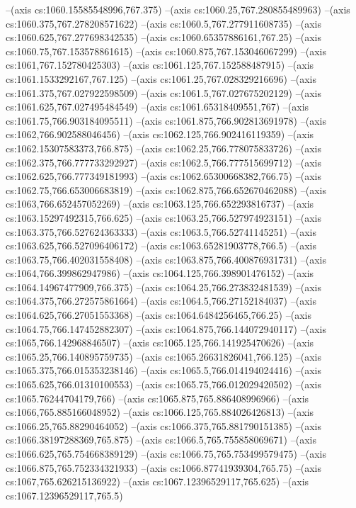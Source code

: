 --(axis cs:1060.15585548996,767.375)
--(axis cs:1060.25,767.280855489963)
--(axis cs:1060.375,767.278208571622)
--(axis cs:1060.5,767.277911608735)
--(axis cs:1060.625,767.277698342535)
--(axis cs:1060.65357886161,767.25)
--(axis cs:1060.75,767.153578861615)
--(axis cs:1060.875,767.153046067299)
--(axis cs:1061,767.152780425303)
--(axis cs:1061.125,767.152588487915)
--(axis cs:1061.1533292167,767.125)
--(axis cs:1061.25,767.028329216696)
--(axis cs:1061.375,767.027922598509)
--(axis cs:1061.5,767.027675202129)
--(axis cs:1061.625,767.027495484549)
--(axis cs:1061.65318409551,767)
--(axis cs:1061.75,766.903184095511)
--(axis cs:1061.875,766.902813691978)
--(axis cs:1062,766.902588046456)
--(axis cs:1062.125,766.902416119359)
--(axis cs:1062.15307583373,766.875)
--(axis cs:1062.25,766.778075833726)
--(axis cs:1062.375,766.777733292927)
--(axis cs:1062.5,766.777515699712)
--(axis cs:1062.625,766.777349181993)
--(axis cs:1062.65300668382,766.75)
--(axis cs:1062.75,766.653006683819)
--(axis cs:1062.875,766.652670462088)
--(axis cs:1063,766.652457052269)
--(axis cs:1063.125,766.652293816737)
--(axis cs:1063.15297492315,766.625)
--(axis cs:1063.25,766.527974923151)
--(axis cs:1063.375,766.527624363333)
--(axis cs:1063.5,766.52741145251)
--(axis cs:1063.625,766.527096406172)
--(axis cs:1063.65281903778,766.5)
--(axis cs:1063.75,766.402031558408)
--(axis cs:1063.875,766.400876931731)
--(axis cs:1064,766.399862947986)
--(axis cs:1064.125,766.398901476152)
--(axis cs:1064.14967477909,766.375)
--(axis cs:1064.25,766.273832481539)
--(axis cs:1064.375,766.272575861664)
--(axis cs:1064.5,766.27152184037)
--(axis cs:1064.625,766.27051553368)
--(axis cs:1064.6484256465,766.25)
--(axis cs:1064.75,766.147452882307)
--(axis cs:1064.875,766.144072940117)
--(axis cs:1065,766.142968846507)
--(axis cs:1065.125,766.141925470626)
--(axis cs:1065.25,766.140895759735)
--(axis cs:1065.26631826041,766.125)
--(axis cs:1065.375,766.015353238146)
--(axis cs:1065.5,766.014194024416)
--(axis cs:1065.625,766.01310100553)
--(axis cs:1065.75,766.012029420502)
--(axis cs:1065.76244704179,766)
--(axis cs:1065.875,765.886408996966)
--(axis cs:1066,765.885166048952)
--(axis cs:1066.125,765.884026426813)
--(axis cs:1066.25,765.88290464052)
--(axis cs:1066.375,765.881790151385)
--(axis cs:1066.38197288369,765.875)
--(axis cs:1066.5,765.755858069671)
--(axis cs:1066.625,765.754668389129)
--(axis cs:1066.75,765.753499579475)
--(axis cs:1066.875,765.752334321933)
--(axis cs:1066.87741939304,765.75)
--(axis cs:1067,765.626215136922)
--(axis cs:1067.12396529117,765.625)
--(axis cs:1067.12396529117,765.5)
